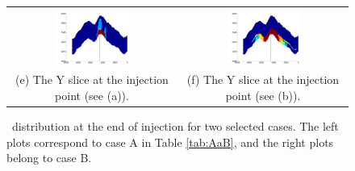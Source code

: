 \begin{figure}
\begin{tabular}{cc}
\includegraphics[width=0.45\textwidth]{./figurer/C02222_CO2atEOI_slcy}&
\includegraphics[width=0.45\textwidth]{./figurer/C03211_CO2atEOI_slcy}
\\(e) The Y slice at the injection point (see (a)).&
(f) The Y slice at the injection point (see (b)).
\end{tabular}
\caption{\coo\ distribution at the end of injection for two selected cases. The left plots correspond to case A in Table \ref{tab:AaB}, and the right plots belong to case B.}
\label{fig:COEOI}
\end{figure}

